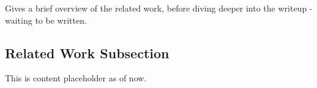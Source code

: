 \documentclass[sigconf]{acmart}
\begin{document}
Gives a brief overview of the related work, before diving deeper into the writeup - waiting to be written.
\subsection{Related Work Subsection}
This is content placeholder as of now.





\end{document}

